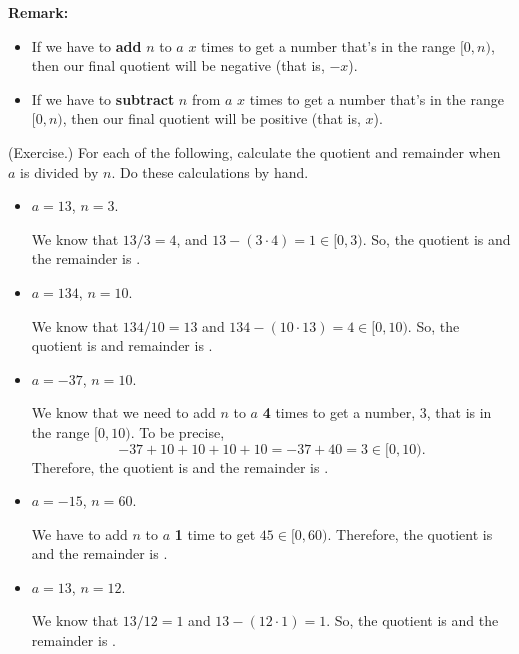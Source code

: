 \documentclass[letterpaper]{article}
\begin{document}
\textbf{Remark:} 
\begin{itemize}
    \item If we have to \textbf{add} $n$ to $a$ $x$ times to get a number that's in the range $[0, n)$, then our final quotient will be negative (that is, $-x$).
    \item If we have to \textbf{subtract} $n$ from $a$ $x$ times to get a number that's in the range $[0, n)$, then our final quotient will be positive (that is, $x$).
\end{itemize}

\begin{mdframed}
    (Exercise.) For each of the following, calculate the quotient and remainder when $a$ is divided by $n$. Do these calculations by hand. 
    \begin{itemize}
        \item $a = 13$, $n = 3$.
        \begin{mdframed}
            We know that $13 / 3 = 4$, and $13 - (3 \cdot 4) = 1 \in [0, 3)$. So, the quotient is  and the remainder is . 
        \end{mdframed}
        \item $a = 134$, $n = 10$.
        \begin{mdframed}
            We know that $134 / 10 = 13$ and $134 - (10 \cdot 13) = 4 \in [0, 10)$. So, the quotient is  and remainder is .
        \end{mdframed}
        \item $a = -37$, $n = 10$.
        \begin{mdframed}
            We know that we need to add $n$ to $a$ \textbf{4} times to get a number, $3$, that is in the range $[0, 10)$. To be precise, 
            \[-37 + 10 + 10 + 10 + 10 = -37 + 40 = 3 \in [0, 10).\]
            Therefore, the quotient is  and the remainder is . 
        \end{mdframed}
        \item $a = -15$, $n = 60$.
        \begin{mdframed}
            We have to add $n$ to $a$ \textbf{1} time to get $45 \in [0, 60)$. Therefore, the quotient is  and the remainder is .
        \end{mdframed}
        \item $a = 13$, $n = 12$.
        \begin{mdframed}
            We know that $13 / 12 = 1$ and $13 - (12 \cdot 1) = 1$. So, the quotient is  and the remainder is .
        \end{mdframed}
    \end{itemize}
\end{mdframed}
\end{document}
